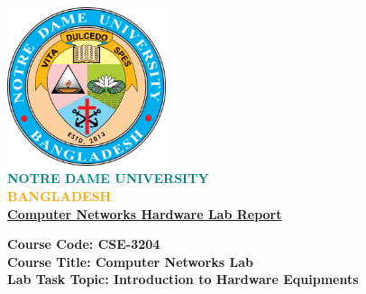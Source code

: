 \documentclass[12pt]{article}
\begin{document}
\begin{titlepage}					%
\begin{center}
    \includegraphics[width=0.35\textwidth]{logo.png} \\
    \vspace{0.5cm}
    \textbf{\Huge \textcolor{teal}{NOTRE DAME} \textcolor{teal}{UNIVERSITY}} \\
    \vspace{0.5cm}
    \textbf{\Huge \textcolor{orange}{BANGLADESH}} \\
    
    \vspace{0.9cm}
    \textbf{\Huge \underline{Computer Networks Hardware Lab Report}} \\
    
    \vspace{1.5em}
    \begin{flushleft}
    	\textbf{\Large Course Code: CSE-3204} \\
		\vspace{0.3cm}        
        \textbf{\Large Course Title: Computer Networks Lab} \\
        \vspace{0.3cm}
        \textbf{\Large Lab Task Topic: Introduction to Hardware Equipments} \\        
    \end{flushleft}
    

\end{center}
\end{titlepage}
\end{document}
